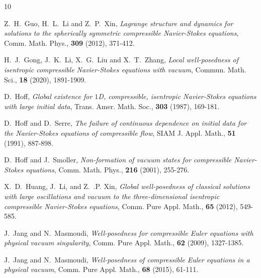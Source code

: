 \documentclass[11pt, reqno]{amsart}
\numberwithin{equation}{section}
\begin{document}
{\begin{thebibliography}{10}

{\sc Z.~H.~Guo, H.~L.~Li and Z.~P.~Xin}, {\em Lagrange structure and dynamics for solutions to the spherically symmetric compressible Navier-Stokes equations}, Comm. Math. Phys., {\bf 309} (2012), 371-412.



{\sc H.~J.~Gong, J.~K.~Li, X.~G.~Liu and X.~T.~Zhang}, {\em Local well-posedness of isentropic compressible Navier-Stokes equations with vacuum}, Commun. Math. Sci., {\bf 18} (2020), 1891-1909.


{\sc D.~Hoff}, {\em Global existence for {$1$}{D}, compressible, isentropic {N}avier-{S}tokes equations with large initial data}, Trans. Amer. Math. Soc., {\bf 303} (1987), 169-181.
	
	
{\sc D.~Hoff and D.~Serre}, {\em The failure of continuous dependence on initial data for the {N}avier-{S}tokes equations of compressible flow}, SIAM J. Appl. Math., {\bf 51} (1991), 887-898.
	
{\sc D.~Hoff and J.~Smoller}, {\em Non-formation of vacuum states for compressible {N}avier-{S}tokes equations}, Comm. Math. Phys., {\bf 216} (2001), 255-276.

{\sc X.~D.~Huang, J.~Li, and Z.~.P. Xin}, {\em Global well-posedness of classical solutions with large oscillations and vacuum to the three-dimensional isentropic compressible Navier-Stokes equations}, Comm. Pure Appl. Math., {\bf 65} (2012), 549-585.


{\sc J.~Jang and N.~Masmoudi}, {\em Well-posedness for compressible Euler equations with physical vacuum singularity}, Comm. Pure Appl. Math., {\bf 62} (2009),  1327-1385.


{\sc J.~Jang and N.~Masmoudi}, {\em Well-posedness of compressible Euler equations in a physical vacuum}, Comm. Pure Appl. Math., {\bf 68} (2015), 61-111.



\end{thebibliography}}
\end{document}
